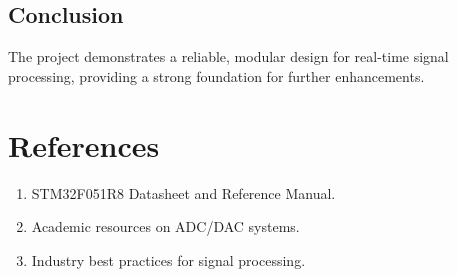 \documentclass[12pt]{article}
\begin{document}
\subsection{Conclusion}
The project demonstrates a reliable, modular design for real-time signal processing, providing a strong foundation for further enhancements.

\section{References}
\begin{enumerate}[leftmargin=2em]
    \item STM32F051R8 Datasheet and Reference Manual.
    \item Academic resources on ADC/DAC systems.
    \item Industry best practices for signal processing.
\end{enumerate}
\end{document}
